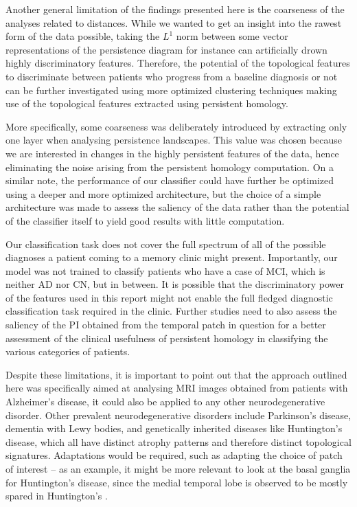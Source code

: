 \documentclass{article}
\begin{document}
Another general limitation of the findings presented here is the coarseness of the analyses related
to distances. While we wanted to get an insight into the rawest form of the data possible, taking
the $L^1$ norm between some vector representations of the persistence diagram for instance can
artificially drown highly discriminatory features. Therefore, the potential of the topological
features to discriminate between patients who progress from a baseline diagnosis or not can be
further investigated using more optimized clustering techniques making use of the topological
features extracted using persistent homology.

More specifically, some coarseness was deliberately introduced by extracting only one layer when
analysing persistence landscapes. This value was chosen because we are interested in changes in the
highly persistent features of the data, hence eliminating the noise arising from the persistent
homology computation. On a similar note, the performance of our classifier could have further be
optimized using a deeper and more optimized architecture, but the choice of a simple architecture
was made to assess the saliency of the data rather than the potential of the classifier itself to
yield good results with little computation.

Our classification task does not cover the full spectrum of all of the possible diagnoses a patient
coming to a memory clinic might present. Importantly, our model was not trained to classify patients
who have a case of MCI, which is neither AD nor CN, but in between. It is possible that the
discriminatory power of the features used in this report might not enable the full fledged
diagnostic classification task required in the clinic. Further studies need to also assess the
saliency of the PI obtained from the temporal patch in question for a better assessment of the
clinical usefulness of persistent homology in classifying the various categories of patients.

Despite these limitations, it is important to point out that the approach outlined here was
specifically aimed at analysing MRI images obtained from patients with Alzheimer's disease, it could
also be applied to any other neurodegenerative disorder. Other prevalent neurodegenerative disorders
include Parkinson's disease, dementia with Lewy bodies, and genetically inherited diseases like
Huntington's disease, which all have distinct atrophy patterns and therefore distinct topological signatures.
Adaptations would be required, such as adapting the choice of patch of interest -- as an example, it
might be more relevant to look at the basal ganglia for Huntington's disease, since the medial
temporal lobe is observed to be mostly spared in Huntington's \citep{halliday1998regional,
  kuhl1982cerebral, kassubek2004topography}.
\end{document}
